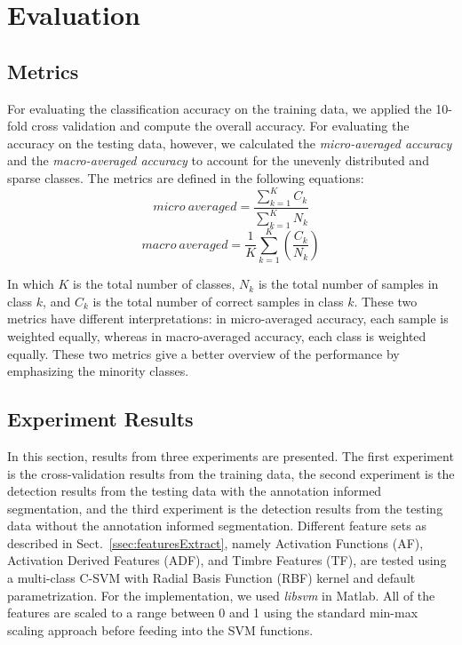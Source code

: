 \documentclass{article}
\begin{document}
{{{{{{{%

\section{Evaluation}\label{sec:eval}
\subsection{Metrics}\label{ssec:metrics}
For evaluating the classification accuracy on the training data, we applied the 10-fold cross validation and compute the overall accuracy. For evaluating the accuracy on the testing data, however, we calculated the \textit{micro-averaged accuracy} and the \textit{macro-averaged accuracy}\cite{yang1999} to account for the unevenly distributed and sparse classes. The metrics are defined in the following equations:
\begin{equation}
micro~averaged = \frac{ \sum_{k = 1}^{K} C_{k} }{ \sum_{k = 1}^{K} N_{k} }
\end{equation}
\begin{equation}
macro~averaged = \frac{1}{K} \sum_{k = 1}^{K} (\frac{C_{k}}{N_{k}})
\end{equation}

In which $K$ is the total number of classes, $N_{k}$ is the total number of samples in class $k$, and $C_{k}$ is the total number of correct samples in class $k$. These two metrics have different interpretations: in micro-averaged accuracy, each sample is weighted equally, whereas in macro-averaged accuracy, each class is weighted equally. These two metrics give a better overview of the performance by emphasizing the minority classes.  


\subsection{Experiment Results}\label{ssec:results}
In this section, results from three experiments are presented. The first experiment is the cross-validation results from the training data, the second experiment is the detection results from the testing data with the annotation informed segmentation, and the third experiment is the detection results from the testing data without the annotation informed segmentation. Different feature sets as described in Sect.~\ref{ssec:featuresExtract}, namely Activation Functions (AF), Activation Derived Features (ADF), and Timbre Features (TF), are tested using a multi-class C-SVM with Radial Basis Function (RBF) kernel and default parametrization. For the implementation, we used \textit{libsvm}\cite{Chang2011} in Matlab.  All of the features are scaled to a range between 0 and 1 using the standard min-max scaling approach before feeding into the SVM functions. 

}}}}}}}
\end{document}
